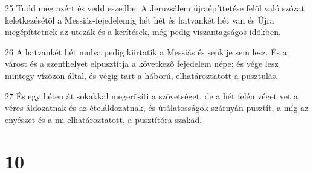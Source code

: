 \par 25 Tudd meg azért és vedd eszedbe: A Jeruzsálem újraépíttetése felõl való szózat keletkezésétõl a Messiás-fejedelemig hét hét és hatvankét hét van és Újra megépíttetnek az utczák és a kerítések,  még pedig viszantagságos idõkben.
\par 26 A hatvankét hét mulva pedig kiirtatik a Messiás és senkije sem lesz. És a várost és a  szenthelyet elpusztítja a következõ fejedelem népe; és vége lesz mintegy vízözön által, és végig tart a háború, elhatároztatott a pusztulás.
\par 27 És egy héten át sokakkal megerõsíti a szövetséget, de a hét felén véget vet a véres áldozatnak és az ételáldozatnak, és útálatosságok szárnyán pusztít, a míg az enyészet és a mi elhatároztatott, a pusztítóra szakad.

\chapter{10}

